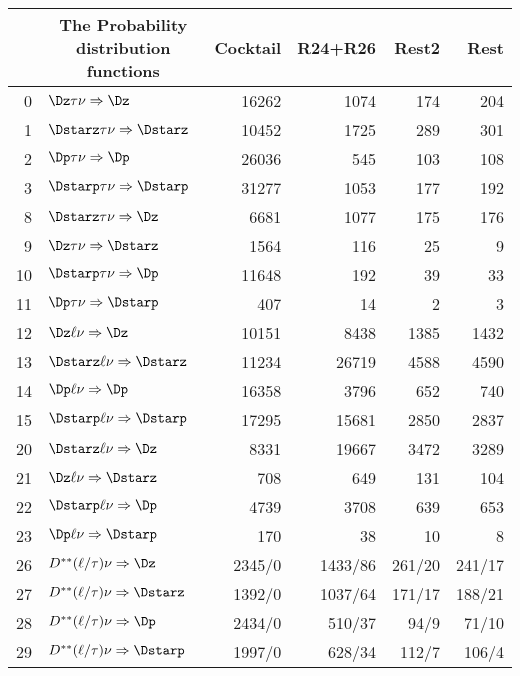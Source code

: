 \documentclass[6pt]{article}
\begin{document}
\begin{tabular}{r l r r r r}\\ \hline\hline
     & \multicolumn{1}{c}{\bf The Probability distribution functions}  &  Cocktail & R24+R26 & Rest2 & Rest  \\ \hline
0    & $\Dz\tau\nu\Rightarrow\Dz$                             & 16262	    & 1074	  & 174	  	& 204        \\
1    & $\Dstarz\tau\nu\Rightarrow\Dstarz$                     & 10452	    & 1725	  & 289	  	& 301        \\
2    & $\Dp\tau\nu\Rightarrow\Dp$                             & 26036	    & 545	  & 103	  	& 108        \\
3    & $\Dstarp\tau\nu\Rightarrow\Dstarp$                     & 31277	    & 1053	  & 177	  	& 192        \\
8    & $\Dstarz\tau\nu\Rightarrow\Dz$                         & 6681	    & 1077	  & 175	  	& 176        \\
9    & $\Dz\tau\nu\Rightarrow\Dstarz$                         & 1564	    & 116	  & 25	  	& 9          \\
10   & $\Dstarp\tau\nu\Rightarrow\Dp$                         & 11648	    & 192	  & 39	  	& 33         \\
11   & $\Dp\tau\nu\Rightarrow\Dstarp$                         & 407	    & 14	  & 2	  	& 3          \\
12   & $\Dz\ell\nu\Rightarrow\Dz$                             & 10151	    & 8438	  & 1385  	& 1432       \\
13   & $\Dstarz\ell\nu\Rightarrow\Dstarz$                     & 11234	    & 26719	  & 4588  	& 4590       \\
14   & $\Dp\ell\nu\Rightarrow\Dp$                             & 16358	    & 3796	  & 652	  	& 740        \\
15   & $\Dstarp\ell\nu\Rightarrow\Dstarp$                     & 17295	    & 15681	  & 2850  	& 2837       \\
20   & $\Dstarz\ell\nu\Rightarrow\Dz$                         & 8331	    & 19667	  & 3472  	& 3289       \\
21   & $\Dz\ell\nu\Rightarrow\Dstarz$                         & 708	    & 649	  & 131	  	& 104        \\
22   & $\Dstarp\ell\nu\Rightarrow\Dp$                         & 4739	    & 3708	  & 639	  	& 653        \\
23   & $\Dp\ell\nu\Rightarrow\Dstarp$                         & 170	    & 38	  & 10	  	& 8          \\
26   & $D^{**}(\ell/\tau)\nu\Rightarrow\Dz$                   & 2345/0	    & 1433/86	  & 261/20	& 241/17        \\
27   & $D^{**}(\ell/\tau)\nu\Rightarrow\Dstarz$               & 1392/0	    & 1037/64	  & 171/17	& 188/21        \\
28   & $D^{**}(\ell/\tau)\nu\Rightarrow\Dp$                   & 2434/0	    & 510/37	  & 94/9	& 71/10         \\
29   & $D^{**}(\ell/\tau)\nu\Rightarrow\Dstarp$               & 1997/0	    & 628/34	  & 112/7	& 106/4         \\\hline 
\hline \hline 
\end{tabular}\newpage
\end{document}
